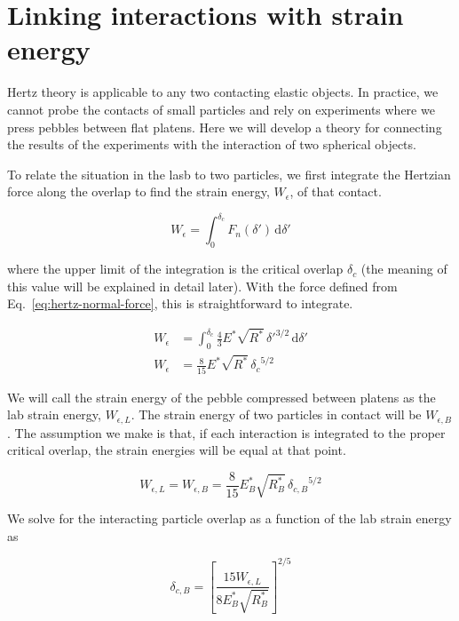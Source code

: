 \section{Linking interactions with strain energy}\label{sec:theoryStrainEnergy}
Hertz theory is applicable to any two contacting elastic objects. In practice, we cannot probe the contacts of small particles and rely on experiments where we press pebbles between flat platens. Here we will develop a theory for connecting the results of the experiments with the interaction of two spherical objects.

To relate the situation in the lasb to two particles, we first integrate the Hertzian force along the overlap to find the strain energy, $W_\epsilon$, of that contact. 

\begin{equation}
	W_\epsilon = \int_0^{\delta_c}\!F_n(\delta')\,\mathrm{d}\delta'
\end{equation}

where the upper limit of the integration is the critical overlap $\delta_c$ (the meaning of this value will be explained in detail later). With the force defined from Eq.~\ref{eq:hertz-normal-force}, this is straightforward to integrate.

\begin{align}
	W_\epsilon& = \int_0^{\delta_c}\!  \frac{4}{3}E^*\sqrt{R^*}\,\delta'^{3/2} \,\mathrm{d}\delta' \\
	W_\epsilon & = \frac{8}{15}E^*\sqrt{R^*}\, {\delta_c}^{5/2}
\end{align}

We will call the strain energy of the pebble compressed between platens as the lab strain energy, $W_{\epsilon,L}$. The strain energy of two particles in contact will be $W_{\epsilon,B}$. The assumption we make is that, if each interaction is integrated to the proper critical overlap, the strain energies will be equal at that point.

\begin{equation}
	W_{\epsilon,L} = W_{\epsilon,B} = \frac{8}{15}E_B^*\sqrt{R_B^*}\, {\delta_{c,B}}^{5/2}
\end{equation}

We solve for the interacting particle overlap as a function of the lab strain energy as

\begin{equation}
	\delta_{c,B} = \left[\frac{15W_{\epsilon,L}}{8E_B^*\sqrt{R_B^*}}\right]^{2/5}
\end{equation}

